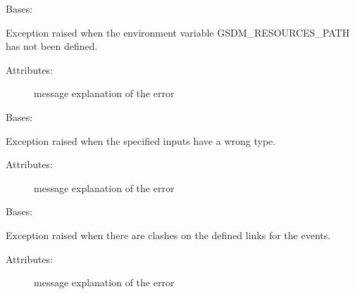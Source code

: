 
\begin{fulllineitems}
\label{\detokenize{gsdm.engine:gsdm.engine.errors.GsdmResourcesPathNotAvailable}}
Bases: {\hyperref[\detokenize{gsdm.engine:gsdm.engine.errors.Error}]{}}

Exception raised when the environment variable GSDM\_RESOURCES\_PATH has not been defined.
\begin{description}
\item[{Attributes:}] \leavevmode
message \textendash{} explanation of the error

\end{description}

\end{fulllineitems}


\begin{fulllineitems}
\label{\detokenize{gsdm.engine:gsdm.engine.errors.InputError}}
Bases: {\hyperref[\detokenize{gsdm.engine:gsdm.engine.errors.Error}]{}}

Exception raised when the specified inputs have a wrong type.
\begin{description}
\item[{Attributes:}] \leavevmode
message \textendash{} explanation of the error

\end{description}

\end{fulllineitems}


\begin{fulllineitems}
\label{\detokenize{gsdm.engine:gsdm.engine.errors.LinksInconsistency}}
Bases: {\hyperref[\detokenize{gsdm.engine:gsdm.engine.errors.Error}]{}}

Exception raised when there are clashes on the defined links for the events.
\begin{description}
\item[{Attributes:}] \leavevmode
message \textendash{} explanation of the error

\end{description}

\end{fulllineitems}

